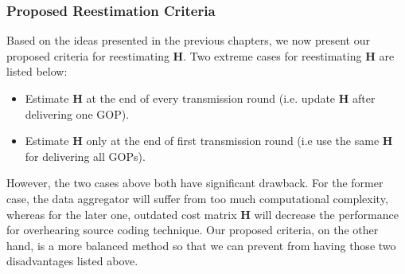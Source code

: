 {\subsubsection{Proposed Reestimation Criteria}
Based on the ideas presented in the previous chapters, we now present our proposed criteria for reestimating $\mathbf{H}$.
Two extreme cases for reestimating $\mathbf{H}$ are listed below:
\begin{itemize}
\item Estimate $\mathbf{H}$ at the end of every transmission round (i.e. update $\mathbf{H}$ after delivering one GOP).
\item Estimate $\mathbf{H}$ only at the end of first transmission round (i.e use the same $\mathbf{H}$ for delivering all GOPs).
\end{itemize}
However, the two cases above both have significant drawback.
For the former case, the data aggregator will suffer from too much computational complexity, whereas for the later one, outdated cost matrix $\mathbf{H}$ will decrease the performance for overhearing source coding technique.
Our proposed criteria, on the other hand, is a more balanced method so that we can prevent from having those two disadvantages listed above.

}
